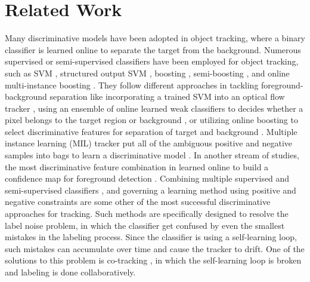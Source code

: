 \documentclass[conference,twoside]{IEEEtran}
\begin{document}
\section{Related Work}
\label{sect:related}
Many discriminative models have been adopted in object tracking, where a binary classifier is learned online to separate the target from the background. Numerous supervised or semi-supervised classifiers have been employed for object tracking, such as SVM \cite{avidan2004support}, structured output SVM \cite{hare2011struck}, boosting \cite{grabner2006real}, semi-boosting \cite{grabner2008semi}, and online multi-instance boosting \cite{babenko2009visual}. They follow different approaches in tackling foreground-background separation like incorporating a trained SVM into an optical flow tracker \cite{avidan2004support}, using an ensemble of online learned weak classifiers to decides whether a pixel belongs to the target region or background \cite{avidan2007ensemble}, or utilizing online boosting to select discriminative features for separation of target and background \cite{grabner2006real}. Multiple instance learning (MIL) tracker put all of the ambiguous positive and negative samples into bags to learn a discriminative model \cite{babenko2009visual}. In another stream of studies, the most discriminative feature combination in learned online to build a confidence map for foreground detection \cite{collins2005online}. Combining multiple supervised and semi-supervised classifiers \cite{stalder2009beyond}, and governing a learning method using positive and negative constraints \cite{kalal2012tracking} are some other of the most successful discriminative approaches for tracking. Such methods are specifically designed to resolve the label noise problem, in which the classifier get confused by even the smallest mistakes in the labeling process. Since the classifier is using a self-learning loop, such mistakes can accumulate over time and cause the tracker to drift. One of the solutions to this problem is co-tracking \cite{tang2007co}, in which the self-learning loop is broken and labeling is done collaboratively. 
\end{document}

